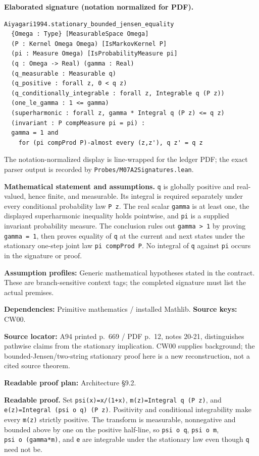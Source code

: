 \documentclass[
  11pt,
]{article}
\let\LedgerOriginalTexttt\texttt
\renewcommand{\texttt}[1]{{\small\LedgerOriginalTexttt{#1}}}
\begin{document}
\textbf{Elaborated signature (notation normalized for PDF).}

\begin{verbatim}
Aiyagari1994.stationary_bounded_jensen_equality
  {Omega : Type} [MeasurableSpace Omega]
  (P : Kernel Omega Omega) [IsMarkovKernel P]
  (pi : Measure Omega) [IsProbabilityMeasure pi]
  (q : Omega -> Real) (gamma : Real)
  (q_measurable : Measurable q)
  (q_positive : forall z, 0 < q z)
  (q_conditionally_integrable : forall z, Integrable q (P z))
  (one_le_gamma : 1 <= gamma)
  (superharmonic : forall z, gamma * Integral q (P z) <= q z)
  (invariant : P compMeasure pi = pi) :
  gamma = 1 and
    for (pi compProd P)-almost every (z,z'), q z' = q z
\end{verbatim}

The notation-normalized display is line-wrapped for the ledger PDF; the
exact parser output is recorded by \texttt{Probes/M07A2Signatures.lean}.

\textbf{Mathematical statement and assumptions.} \texttt{q} is globally
positive and real-valued, hence finite, and measurable. Its integral is
required separately under every conditional probability law
\texttt{P\ z}. The real scalar \texttt{gamma} is at least one, the
displayed superharmonic inequality holds pointwise, and \texttt{pi} is a
supplied invariant probability measure. The conclusion rules out
\texttt{gamma\ \textgreater{}\ 1} by proving \texttt{gamma\ =\ 1}, then
proves equality of \texttt{q} at the current and next states under the
stationary one-step joint law \texttt{pi\ compProd\ P}. No integral of
\texttt{q} against \texttt{pi} occurs in the signature or proof.

\textbf{Assumption profiles:} Generic mathematical hypotheses stated in
the contract. These are branch-sensitive context tags; the completed
signature must list the actual premises.

\textbf{Dependencies:} Primitive mathematics / installed Mathlib.
\textbf{Source keys:} CW00.

\textbf{Source locator:} A94 printed p.~669 / PDF p.~12, notes 20-21,
distinguishes pathwise claims from the stationary implication. CW00
supplies background; the bounded-Jensen/two-string stationary proof here
is a new reconstruction, not a cited source theorem.

\textbf{Readable proof plan:} Architecture §9.2.

\textbf{Readable proof.} Set \texttt{psi(x)=x/(1+x)},
\texttt{m(z)=Integral\ q\ (P\ z)}, and
\texttt{e(z)=Integral\ (psi\ o\ q)\ (P\ z)}. Positivity and conditional
integrability make every \texttt{m(z)} strictly positive. The transform
is measurable, nonnegative and bounded above by one on the positive
half-line, so \texttt{psi\ o\ q}, \texttt{psi\ o\ m},
\texttt{psi\ o\ (gamma*m)}, and \texttt{e} are integrable under the
stationary law even though \texttt{q} need not be.
\end{document}
